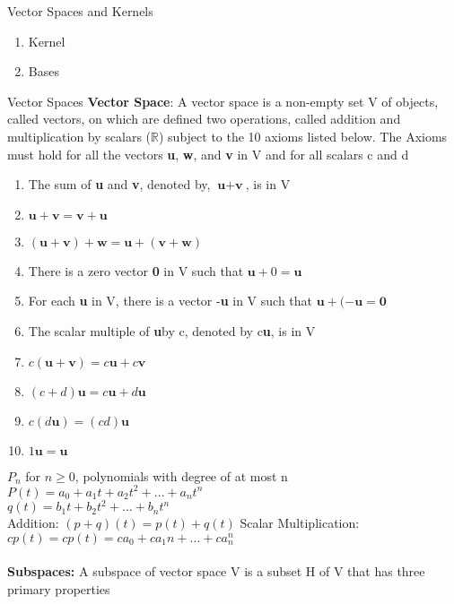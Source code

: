 \documentclass[a4paper, 12pt]{article}
\begin{document}
\begin{section}{Vector Spaces and Kernels}
\begin{subsection}
\begin{enumerate}
\item{Kernel}
\item{Bases}
\end{enumerate}
\end{subsection}
\begin{subsection}{Vector Spaces}
\textbf{Vector Space}: A vector space is a non-empty set V of objects,
called vectors, on which are defined two operations, called addition
and multiplication by scalars ($\mathbb{R}$) subject to the 10 axioms
listed below. The Axioms must hold for all the vectors \textbf{u},
\textbf{w}, and \textbf{v} in V and for all scalars c and d
\begin{enumerate}
\item{The sum of \textbf{u} and \textbf{v}, denoted by,
$\textbf{u}+\textbf{v}$, is in V}
\item{$\textbf{u}+\textbf{v}=\textbf{v}+\textbf{u}$}
\item{$(\textbf{u}+\textbf{v})+\textbf{w}=
\textbf{u}+(\textbf{v}+\textbf{w})$}
\item{There is a zero vector \textbf{0} in V such that 
$\textbf{u}+0=\textbf{u}$}
\item{For each \textbf{u} in V, there is a vector -\textbf{u} in V
such that $\textbf{u}+(-\textbf{u}=\textbf{0}$}
\item{The scalar multiple of \textbf{u}by c, denoted by c\textbf{u}, is
in V}
\item{$c(\textbf{u}+\textbf{v})=c \textbf{u}+c \textbf{v}$}
\item{$(c+d)\textbf{u}=c\textbf{u}+d\textbf{u}$}
\item{$c(d\textbf{u})=(cd)\textbf{u}$}
\item{$1\textbf{u}=\textbf{u}$}
\end{enumerate}
$P_{n}$ for $n \geq 0$, polynomials with degree of at most n
$P(t)=a_0+a_1t+a_2t^{2}+\dots+a_{n}t^{n}$\\
$q(t)=b_1t+b_2t^{2}+\dots+b_{n}t^{n}$\\
Addition:
$(p+q)(t)=p(t)+q(t)$
Scalar Multiplication:
$cp(t)=cp(t)=ca_0+ca_1n+\dots+ca_{n}^{n}$
\\ \\
\textbf{Subspaces:} A subspace of vector space V is a subset H of V that 
has three primary properties\\
\end{subsection}
\end{section}
\end{document}
